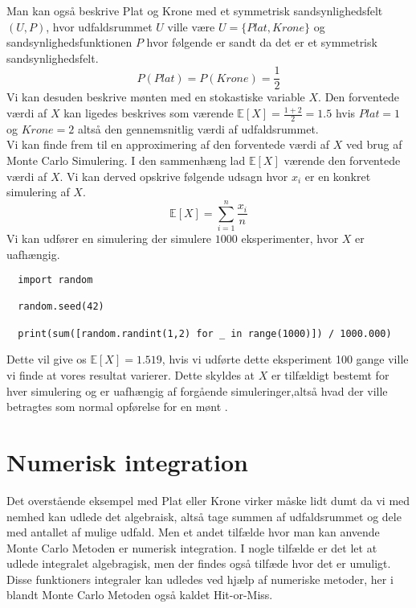 \documentclass[../../SRP.tex]{subfiles}
\begin{document}
Man kan også beskrive Plat og Krone med et symmetrisk sandsynlighedsfelt $(U, P)$, hvor udfaldsrummet $U$ ville være $U = \{Plat, Krone\}$ og sandsynlighedsfunktionen $P$ hvor følgende er sandt da det er et symmetrisk sandsynlighedsfelt.
\begin{equation}
  P(Plat) = P(Krone) = \frac{1}{2}
\end{equation}
Vi kan desuden beskrive mønten med en stokastiske variable $X$. Den forventede værdi af $X$ kan ligedes beskrives som værende $\mathbb{E}[X] = \frac{1 + 2}{2} = 1.5$ hvis $Plat = 1$ og $Krone = 2$ altså den gennemsnitlig værdi af udfaldsrummet. \\

Vi kan finde frem til en approximering af den forventede værdi af $X$ ved brug af Monte Carlo Simulering. I den sammenhæng lad $\mathbb{E}[X]$ værende den forventede værdi af $X$. Vi kan derved opskrive følgende udsagn hvor $x_i$ er en konkret simulering af $X$.
\begin{equation}
  \mathbb{E}[X] = \sum\limits_{i=1}^n\frac{x_i}{n}
\end{equation}
Vi kan udfører en simulering der simulere $1000$ eksperimenter, hvor $X$ er uafhængig.
\begin{lstlisting}
  import random

  random.seed(42)

  print(sum([random.randint(1,2) for _ in range(1000)]) / 1000.000)
\end{lstlisting}
Dette vil give os $\mathbb{E}[X] = 1.519$, hvis vi udførte dette eksperiment 100 gange ville vi finde at vores resultat varierer. Dette skyldes at $X$ er tilfældigt bestemt for hver simulering og er uafhængig af forgående simuleringer,altså hvad der ville betragtes som normal opførelse for en mønt \cite{NM}. \\

\section{Numerisk integration}

Det overstående eksempel med Plat eller Krone virker måske lidt dumt da vi med nemhed kan udlede det algebraisk, altså tage summen af udfaldsrummet og dele med antallet af mulige udfald. Men et andet tilfælde hvor man kan anvende Monte Carlo Metoden er numerisk integration. I nogle tilfælde er det let at udlede integralet algebragisk, men der findes også tilfæde hvor det er umuligt. Disse funktioners integraler kan udledes ved hjælp af numeriske metoder, her i blandt Monte Carlo Metoden også kaldet Hit-or-Miss. \cite{SBM} \\
\end{document}
